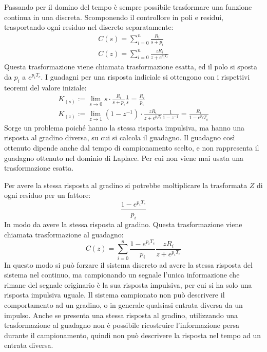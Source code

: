 \documentclass{article}
\numberwithin{equation}{subsection}
\begin{document}
Passando per il domino del tempo è sempre possibile trasformare una funzione continua in una discreta. Scomponendo il controllore in poli e 
residui, trasportando ogni residuo nel discreto separatamente:
\begin{gather}
    C(s)=\displaystyle\sum_{i=0}^{n}\frac{R_i}{s+p_i}\\
    C(z)=\displaystyle\sum_{i=0}^{n}\frac{zR_i}{z+e^{p_iT_c}}
\end{gather}
Questa trasformazione viene chiamata trasformazione esatta, ed il polo si sposta da $p_i$ a $e^{p_iT_c}$. 
I guadagni per una risposta indiciale si ottengono con i rispettivi teoremi del valore iniziale:
\begin{gather}
    K_{(s)}:=\lim_{s\to0}s\cdot\displaystyle\frac{R_i}{s+p_i}\frac{1}{s}=\frac{R_i}{p_i}\\
    K_{(z)}:=\lim_{z\to1}(1-z^{-1})\cdot\displaystyle\frac{zR_i}{z+e^{p_iT_c}}\frac{1}{1-z^{-1}}=\frac{R_i}{1-e^{p_i}T_c}
\end{gather} 
Sorge un problema 
poiché hanno la stessa risposta impulsiva, ma hanno una risposta al gradino diversa, su cui si calcola il guadagno. Il guadagno così ottenuto dipende anche dal tempo 
di campionamento scelto, e non rappresenta il guadagno ottenuto nel dominio di Laplace. Per cui non viene mai usata una trasformazione esatta. 

Per avere la stessa risposta al gradino si potrebbe 
moltiplicare la trasformata $Z$ di ogni residuo per un fattore: 
\begin{equation*}
    \displaystyle\frac{1-e^{p_iT_c}}{p_i}
\end{equation*}
In modo da avere la stessa risposta al gradino. Questa trasformazione 
viene chiamata trasformazione al guadagno: 
\begin{equation}
    C(z)=\displaystyle\sum_{i=0}^{n}\frac{1-e^{p_iT_c}}{p_i}\frac{zR_i}{z+e^{p_iT_c}}
\end{equation}
In questo modo si può forzare il sistema discreto ad avere la stessa risposta del sistema nel continuo, ma campionando un segnale l'unica informazione che rimane del segnale 
originario è la sua risposta impulsiva, per cui si ha solo una risposta impulsiva uguale. Il sistema campionato non può descrivere il comportamento ad un gradino, o in 
generale qualsiasi entrata diversa da un impulso. Anche se presenta una stessa risposta al gradino, utilizzando una trasformazione al guadagno non è possibile 
ricostruire l'informazione persa durante il campionamento, quindi non può descrivere la risposta nel tempo ad un entrata diversa. 
\end{document}
